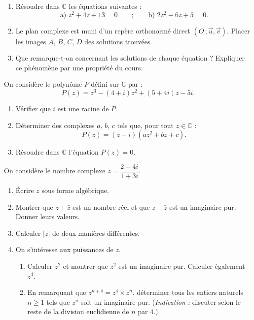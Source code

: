 \documentclass[11pt]{article}
\newcounter{popsec}
\newcounter{popsub}
\newcommand{\courssub}[1]{%
  \stepcounter{popsub}%
  \par\vspace{9pt}\noindent{\popxbold\fontsize{11.5}{13}\selectfont\color{popink}{\color{poporange}\thepopsec.\thepopsub}\hspace{6pt}#1}\par\nopagebreak\vspace{4pt}
}
\begin{document}
\begin{exercice}
\begin{enumerate}
\item Résoudre dans $\mathbb{C}$ les équations suivantes :
\[ \text{a) } z^2 + 4z + 13 = 0 \qquad ; \qquad \text{b) } 2z^2 - 6z + 5 = 0. \]
\item Le plan complexe est muni d'un repère orthonormé direct $(O\,;\vec{u},\vec{v})$. Placer les images $A$, $B$, $C$, $D$ des solutions trouvées.
\item Que remarque-t-on concernant les solutions de chaque équation ? Expliquer ce phénomène par une propriété du cours.
\end{enumerate}
\end{exercice}

\begin{exercice}
On considère le polynôme $P$ défini sur $\mathbb{C}$ par :
\[ P(z) = z^3 - (4+i)z^2 + (5+4i)z - 5i. \]
\begin{enumerate}
\item Vérifier que $i$ est une racine de $P$.
\item Déterminer des complexes $a$, $b$, $c$ tels que, pour tout $z \in \mathbb{C}$ :
\[ P(z) = (z - i)(az^2 + bz + c). \]
\item Résoudre dans $\mathbb{C}$ l'équation $P(z) = 0$.
\end{enumerate}
\end{exercice}

\courssub{Je me prépare au Bac}

\begin{exercice}
On considère le nombre complexe $z = \dfrac{2-4i}{1+3i}$.
\begin{enumerate}
\item Écrire $z$ sous forme algébrique.
\item Montrer que $z + \bar{z}$ est un nombre réel et que $z - \bar{z}$ est un imaginaire pur. Donner leurs valeurs.
\item Calculer $|z|$ de deux manières différentes.
\item On s'intéresse aux puissances de $z$.
\begin{enumerate}
\item Calculer $z^2$ et montrer que $z^2$ est un imaginaire pur. Calculer également $z^4$.
\item En remarquant que $z^{n+4} = z^4 \times z^n$, déterminer tous les entiers naturels $n \geq 1$ tels que $z^n$ soit un imaginaire pur. (\emph{Indication :} discuter selon le reste de la division euclidienne de $n$ par $4$.)
\end{enumerate}
\end{enumerate}
\end{exercice}
\end{document}
